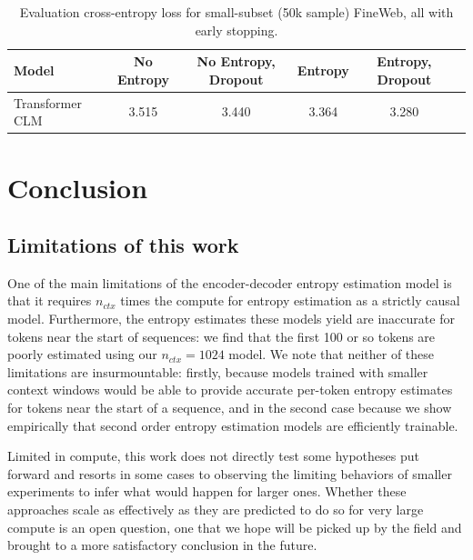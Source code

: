 \documentclass{article}
\begin{document}
    \begin{center}
    \begin{table}[H]
    \begin{center}
    \renewcommand{\arraystretch}{1.2}
    \begin{tabular}{||l c c c c c||} 
     \hline
      Model & No Entropy & No Entropy, Dropout & Entropy & Entropy, Dropout &\\ 
     \hline
      Transformer CLM & 3.515 & 3.440 & 3.364 & 3.280 & \\
     \hline
     \hline 
    \end{tabular}
    \end{center}
    \vspace{0.1cm}
    \caption{Evaluation cross-entropy loss for small-subset (50k sample) FineWeb, all with early stopping.}
    \label{table3}
    \end{table}
    \end{center}

\section{Conclusion}

    \subsection{Limitations of this work}

    One of the main limitations of the encoder-decoder entropy estimation model is that it requires $n_{ctx}$ times the compute for entropy estimation as a strictly causal model. Furthermore, the entropy estimates these models yield are inaccurate for tokens near the start of sequences: we find that the first 100 or so tokens are poorly estimated using our $n_{ctx}=1024$ model. We note that neither of these limitations are insurmountable: firstly, because models trained with smaller context windows would be able to provide accurate per-token entropy estimates for tokens near the start of a sequence, and in the second case because we show empirically that second order entropy estimation models are efficiently trainable.

    Limited in compute, this work does not directly test some hypotheses put forward and resorts in some cases to observing the limiting behaviors of smaller experiments to infer what would happen for larger ones. Whether these approaches scale as effectively as they are predicted to do so for very large compute is an open question, one that we hope will be picked up by the field and brought to a more satisfactory conclusion in the future.
\end{document}
